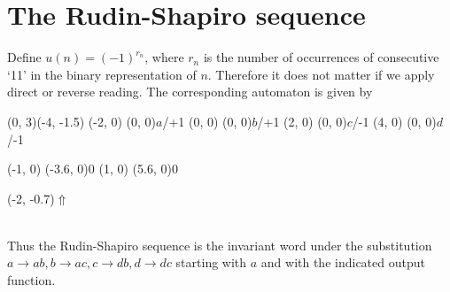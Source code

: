 \documentclass{article}
\begin{document}
\section*{The Rudin-Shapiro sequence}
Define $u(n) = (-1)^{r_n}$, where $r_n$ is the number of occurrences of
consecutive `11' in the binary representation of $n$. Therefore it does not 
matter if we apply direct or reverse reading. The corresponding automaton is
given by\\
\begin{graph}(0, 3)(-4, -1.5)
  (-2, 0) (0, 0){\bs$a$/+1\es}
  (0, 0)  (0, 0){\bs$b$/+1\es}
  (2, 0)  (0, 0){\bs$c$/-1\es}
  (4, 0)  (0, 0){\bs$d$/-1\es}

  (-1, 0) \freetext(-3.6, 0){0}
   
   
   
   
   
  (1, 0) \freetext(5.6, 0){0}
   

  \freetext(-2, -0.7){$\Uparrow$}
\end{graph}\\
Thus the Rudin-Shapiro sequence is the invariant word under the substitution
$a \to ab, b \to ac, c \to db, d \to dc$
starting with $a$ and with the indicated output function.
\end{document}
